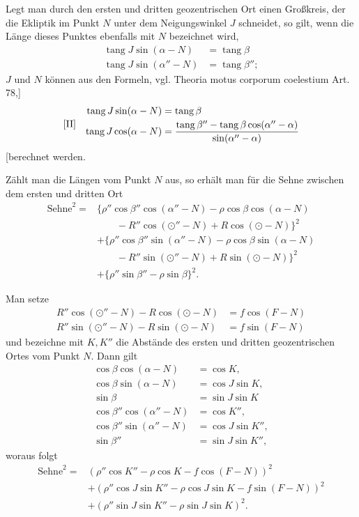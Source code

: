 Legt man durch den ersten und dritten geozentrischen Ort einen Großkreis, der die Ekliptik im Punkt \(N\) unter dem Neigungswinkel \(J\) schneidet, so gilt, wenn die Länge dieses Punktes ebenfalls mit \(N\) bezeichnet wird,
\[
\begin{aligned}
\operatorname{tang}J\sin(\alpha-N)&=\operatorname{tang}\beta\\
\operatorname{tang}J\sin(\alpha''-N)&=\operatorname{tang}\beta'';
\end{aligned}
\]
\(J\) und \(N\) können aus den Formeln, vgl. Theoria motus corporum coelestium Art. 78,]
\[
\begin{array}{l@{\quad}l}
[\mathrm{II}]&\begin{aligned}
\operatorname{tang}J\sin(\alpha-N)&=\operatorname{tang}\beta\\
\operatorname{tang}J\cos(\alpha-N)&=\frac{\operatorname{tang}\beta''-\operatorname{tang}\beta\cos(\alpha''-\alpha)}{\sin(\alpha''-\alpha)}
\end{aligned}
\end{array}
\]
[berechnet werden.

Zählt man die Längen vom Punkt \(N\) aus, so erhält man für die Sehne zwischen dem ersten und dritten Ort
\[
\begin{aligned}
\text{Sehne}^2={}&\bigl\{\rho''\cos\beta''\cos(\alpha''-N)-\rho\cos\beta\cos(\alpha-N)\\
&\qquad{}-R''\cos(\odot''-N)+R\cos(\odot-N)\bigr\}^2\\
&+\bigl\{\rho''\cos\beta''\sin(\alpha''-N)-\rho\cos\beta\sin(\alpha-N)\\
&\qquad{}-R''\sin(\odot''-N)+R\sin(\odot-N)\bigr\}^2\\
&+\{\rho''\sin\beta''-\rho\sin\beta\}^2.
\end{aligned}
\]

Man setze
\[
\begin{aligned}
R''\cos(\odot''-N)-R\cos(\odot-N)&=f\cos(F-N)\\
R''\sin(\odot''-N)-R\sin(\odot-N)&=f\sin(F-N)
\end{aligned}
\]
und bezeichne mit \(K,K''\) die Abstände des ersten und dritten geozentrischen Ortes vom Punkt \(N\). Dann gilt
\[
\begin{aligned}
\cos\beta\cos(\alpha-N)&=\cos K,\\
\cos\beta\sin(\alpha-N)&=\cos J\sin K,\\
\sin\beta&=\sin J\sin K\\
\cos\beta''\cos(\alpha''-N)&=\cos K'',\\
\cos\beta''\sin(\alpha''-N)&=\cos J\sin K'',\\
\sin\beta''&=\sin J\sin K'',
\end{aligned}
\]
woraus folgt
\[
\begin{aligned}
\text{Sehne}^2={}&(\rho''\cos K''-\rho\cos K-f\cos(F-N))^2\\
&+(\rho''\cos J\sin K''-\rho\cos J\sin K-f\sin(F-N))^2\\
&+(\rho''\sin J\sin K''-\rho\sin J\sin K)^2.
\end{aligned}
\]

